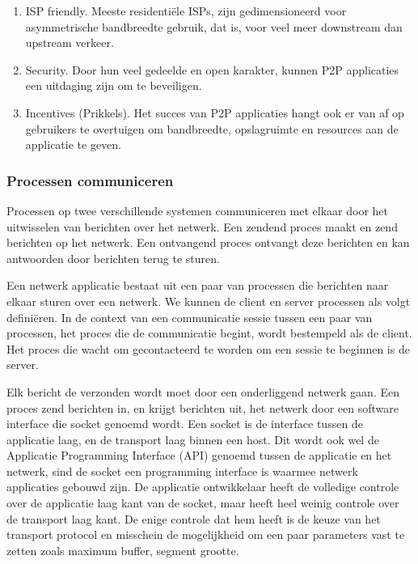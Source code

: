 \begin{enumerate}
    \item ISP friendly. Meeste residentiële ISPs, zijn gedimensioneerd voor asymmetrische bandbreedte gebruik, dat is, voor veel meer downstream dan upstream verkeer.
    \item Security. Door hun veel gedeelde en open karakter, kunnen P2P applicaties een uitdaging zijn om te beveiligen.
    \item Incentives (Prikkels). Het succes van P2P applicaties hangt ook er van af op gebruikers te overtuigen om bandbreedte, opslagruimte en resources aan de applicatie te geven.
\end{enumerate}


\subsubsection{Processen communiceren}

Processen op twee verschillende systemen communiceren met elkaar door het uitwisselen van berichten over het netwerk. Een zendend proces maakt en zend berichten op het netwerk. Een ontvangend proces ontvangt deze berichten en kan antwoorden door berichten terug te sturen.


Een netwerk applicatie bestaat uit een paar van processen die berichten naar elkaar sturen over een netwerk. We kunnen de client en server processen als volgt definiëren.
In de context van een communicatie sessie tussen een paar van processen, het proces die de communicatie begint, wordt bestempeld als de client. Het proces die wacht om gecontacteerd te worden om een sessie te beginnen is de server.


Elk bericht de verzonden wordt moet door een onderliggend netwerk gaan. Een proces zend berichten in, en krijgt berichten uit, het netwerk door een software interface die socket genoemd wordt. Een socket is de interface tussen de applicatie laag, en de transport laag binnen een host. Dit wordt ook wel de Applicatie Programming Interface (API) genoemd tussen de applicatie en het netwerk, sind de socket een programming interface is waarmee netwerk applicaties gebouwd zijn. De applicatie ontwikkelaar heeft de volledige controle over de applicatie laag kant van de socket, maar heeft heel weinig controle over de transport laag kant. De enige controle dat hem heeft is de keuze van het transport protocol en misschein de mogelijkheid om een paar parameters vast te zetten zoals maximum buffer, segment grootte. 

